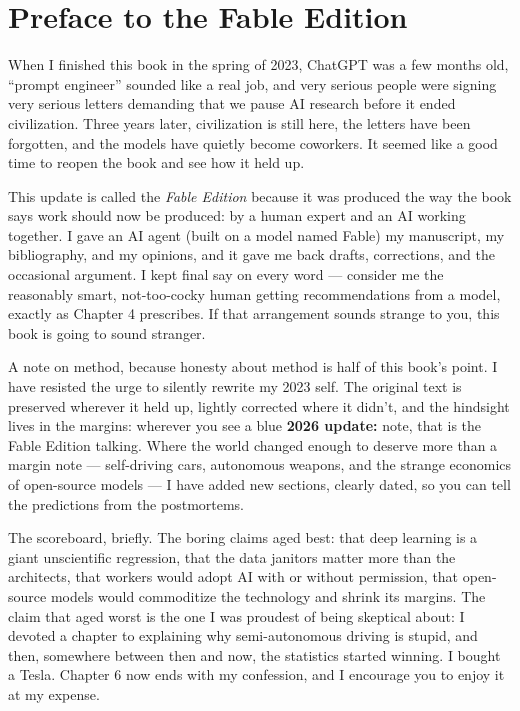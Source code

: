\let\cleardoublepage\clearpage
\chapter*{Preface to the Fable Edition}

When I finished this book in the spring of 2023, ChatGPT was a few months old, ``prompt engineer'' sounded like a real job, and very serious people were signing very serious letters demanding that we pause AI research before it ended civilization. Three years later, civilization is still here, the letters have been forgotten, and the models have quietly become coworkers. It seemed like a good time to reopen the book and see how it held up.

This update is called the \textit{Fable Edition} because it was produced the way the book says work should now be produced: by a human expert and an AI working together. I gave an AI agent (built on a model named Fable) my manuscript, my bibliography, and my opinions, and it gave me back drafts, corrections, and the occasional argument. I kept final say on every word --- consider me the reasonably smart, not-too-cocky human getting recommendations from a model, exactly as Chapter 4 prescribes. If that arrangement sounds strange to you, this book is going to sound stranger.

A note on method, because honesty about method is half of this book's point. I have resisted the urge to silently rewrite my 2023 self. The original text is preserved wherever it held up, lightly corrected where it didn't, and the hindsight lives in the margins: wherever you see a blue \textcolor{fableblue}{\textbf{2026 update:}} note, that is the Fable Edition talking. Where the world changed enough to deserve more than a margin note --- self-driving cars, autonomous weapons, and the strange economics of open-source models --- I have added new sections, clearly dated, so you can tell the predictions from the postmortems.

The scoreboard, briefly. The boring claims aged best: that deep learning is a giant unscientific regression, that the data janitors matter more than the architects, that workers would adopt AI with or without permission, that open-source models would commoditize the technology and shrink its margins. The claim that aged worst is the one I was proudest of being skeptical about: I devoted a chapter to explaining why semi-autonomous driving is stupid, and then, somewhere between then and now, the statistics started winning. I bought a Tesla. Chapter 6 now ends with my confession, and I encourage you to enjoy it at my expense.

